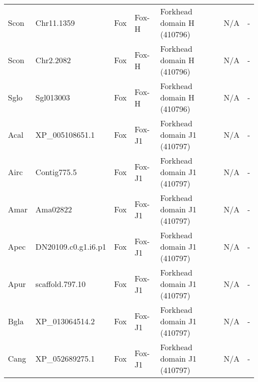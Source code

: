 \documentclass[../main.tex]{subfiles}
\begin{document}
\begin{landscape}
\begin{longtable}{lllllll}
		Scon           & Chr11.1359            & Fox            & Fox-H               & Forkhead domain H (410796)                  & N/A                                                                    & -                    \\
		Scon           & Chr2.2082             & Fox            & Fox-H               & Forkhead domain H (410796)                  & N/A                                                                    & -                    \\
		Sglo           & Sgl013003             & Fox            & Fox-H               & Forkhead domain H (410796)                  & N/A                                                                    & -                    \\
		Acal           & XP\_005108651.1       & Fox            & Fox-J1              & Forkhead domain J1 (410797)                 & N/A                                                                    & -                    \\
		Airc           & Contig775.5           & Fox            & Fox-J1              & Forkhead domain J1 (410797)                 & N/A                                                                    & -                    \\
		Amar           & Ama02822              & Fox            & Fox-J1              & Forkhead domain J1 (410797)                 & N/A                                                                    & -                    \\
		Apec           & DN20109.c0.g1.i6.p1   & Fox            & Fox-J1              & Forkhead domain J1 (410797)                 & N/A                                                                    & -                    \\
		Apur           & scaffold.797.10       & Fox            & Fox-J1              & Forkhead domain J1 (410797)                 & N/A                                                                    & -                    \\
		Bgla           & XP\_013064514.2       & Fox            & Fox-J1              & Forkhead domain J1 (410797)                 & N/A                                                                    & -                    \\
		Cang           & XP\_052689275.1       & Fox            & Fox-J1              & Forkhead domain J1 (410797)                 & N/A                                                                    & -                    \\

\end{longtable}
\end{landscape}
\end{document}
